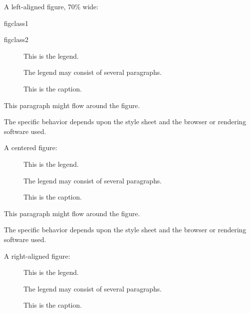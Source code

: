 \documentclass[a4paper]{article}
\begin{document}
A left-aligned figure, 70\% wide:

\begin{DUclass}{figclass1}
\begin{DUclass}{figclass2}
\begin{figure} %
\noindent{}
\caption{This is the caption.}
\begin{DUlegend}
This is the legend.

The legend may consist of several paragraphs.
\end{DUlegend}
\end{figure}
\end{DUclass}
\end{DUclass}

This paragraph might flow around the figure.

The specific behavior depends upon the style sheet and the browser or
rendering software used.

A centered figure:

\begin{figure}
\noindent{}
\caption{This is the caption.}
\begin{DUlegend}
This is the legend.

The legend may consist of several paragraphs.
\end{DUlegend}
\end{figure}

This paragraph might flow around the figure.

The specific behavior depends upon the style sheet and the browser or
rendering software used.

A right-aligned figure:

\begin{figure} %
\noindent{}
\caption{This is the caption.}
\begin{DUlegend}
This is the legend.

The legend may consist of several paragraphs.
\end{DUlegend}
\end{figure}
\end{document}
